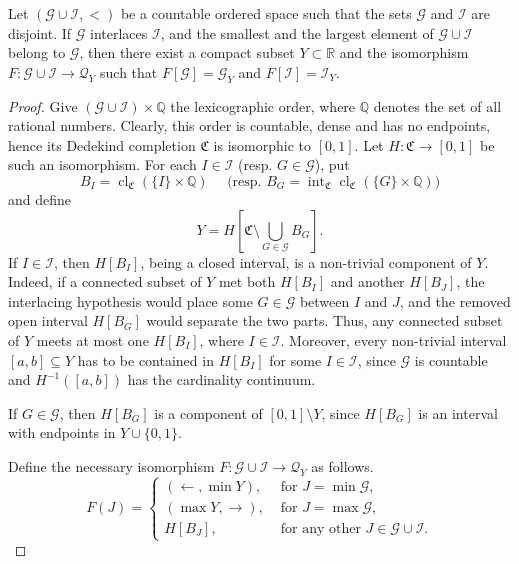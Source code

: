 \documentclass[10pt,a4paper]{amsart}
\newcommand{\cl}{\operatorname{cl}}
\renewcommand{\int}{\operatorname{int}}
\begin{document}
   \begin{thm}\label{tr1}
 Let $(\mathcal  G \cup \mathcal I, <)$ be a countable  ordered space such that  the sets   $ \mathcal G$ and  $\mathcal I $ are disjoint. If $ \mathcal G$ interlaces  $\mathcal I $, and  the smallest and the largest element of $\mathcal  G \cup \mathcal I$ belong to $\mathcal G $, then there exist a compact subset $Y\subset \mathbb R$ and the isomorphism  $F\colon \mathcal G\cup \mathcal I \to \mathcal Q_Y$ such that  $F[\mathcal G] =\mathcal G_Y$ and 
$ F[\mathcal I] =\mathcal I_Y$.  
   \end{thm}

   \begin{proof}  Give $(\mathcal G\cup\mathcal I)\times\mathbb Q$ the lexicographic order, where $\mathbb Q$ denotes the set of all rational numbers. Clearly, this order is countable, dense and has no endpoints, hence its Dedekind completion $\mathfrak C$ is isomorphic to $[0,1]$. Let $H\colon \mathfrak C \to [0,1]$ be such an isomorphism.
For each $I\in \mathcal I$ (resp. $G\in \mathcal G$), put  
$$
B_I=\cl_{\mathfrak C}(\{I\}\times\mathbb Q) \quad \mbox{ (resp. } B_G=\int_{\mathfrak C} \cl_\mathfrak C(\{G\}\times\mathbb Q))$$ and 
define
$$\textstyle 
Y=H\left[\mathfrak C\setminus\bigcup_{G\in\mathcal G}B_G\right].$$
   \indent  If $I\in\mathcal I$, then $H[B_I]$, being a closed interval,  is a non-trivial component of $Y$. Indeed,  if a connected subset of $Y$ met both 
	$H[B_I]$ and another $H[B_{J}]$, the interlacing hypothesis would place some $G\in\mathcal G$ between $I$ and $J$, and the removed open interval $H[B_G]$ would separate the two parts.  Thus, any connected subset of $Y$ meets at most one $H[B_I]$, where $I\in\mathcal I$.	
	Moreover, every non-trivial interval $[a,b] \subseteq Y$ has to be contained in  $H[B_I]$ for some $I\in\mathcal I$, since
	$\mathcal G$ is countable and $H^{-1}([a,b])$ has the cardinality continuum. 
	
	
			If $G\in\mathcal G$, then $H[B_G]$ is a  component of $[0,1] \setminus Y$, since $H[B_G]$ is an interval with endpoints in $Y\cup \{0,1\}$.
			
			Define the necessary isomorphism   $F: \mathcal G\cup \mathcal I \to \mathcal Q_Y$  as follows.
  \[F(J)= \begin{cases}
	  (\leftarrow, \min Y),& \mbox{ for } J= \min \mathcal G,\\
		( \max Y,\rightarrow), & \mbox{ for } J=\max  \mathcal G,\\
		H[B_J],& \mbox{ for any other } J\in \mathcal G \cup \mathcal  I.
	\end{cases}\]			 
   \end{proof} 
\end{document}
